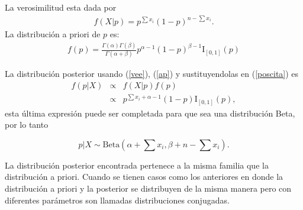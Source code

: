 \noindent La verosimilitud esta dada por
\begin{eqnarray} \label{vee}
f(X|p)= p^{\sum x_i}(1-p)^{n-\sum x_i}.
\end{eqnarray}
La distribuci\'on a priori de $p$ es: 
\begin{eqnarray} \label{ap}
f(p)=\frac{\Gamma(\alpha)\Gamma(\beta)}{\Gamma(\alpha + \beta)} p^{\alpha-1}(1-p)^{\beta-1}\mbox{I}_{[0,1]}(p)
\end{eqnarray}

La distribuci\'on posterior usando (\ref{vee}),  (\ref{ap}) y sustituyendolas en (\ref{poscita}) es
\begin{eqnarray*} 
f(p|X)&\propto& f(X|p)f(p)\\
&\propto& p^{\sum x_i +\alpha-1}(1-p) \mbox{I}_{[0,1]}(p),
\end{eqnarray*}
esta \'ultima expresi\'on puede ser completada para que sea una distribuci\'on Beta, por lo tanto 

$$p|X\sim \mbox{Beta} (\alpha + \sum x_i, \beta+n-\sum x_i).$$

\noindent La distribuci\'on posterior encontrada pertenece a la misma familia que la distribuci\'on a priori. Cuando se tienen casos como los anteriores en donde la distribuci\'on a priori y la posterior se distribuyen de la misma manera pero con diferentes par\'ametros son llamadas distribuciones conjugadas.


%
%


